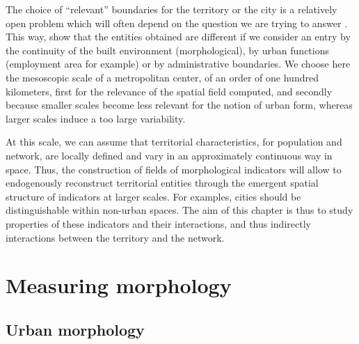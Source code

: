 The choice of ``relevant'' boundaries for the territory or the city is a relatively open problem which will often depend on the question we are trying to answer \citep{paez2005spatial}. This way, \cite{guerois2002commune} show that the entities obtained are different if we consider an entry by the continuity of the built environment (morphological), by urban functions (employment area for example) or by administrative boundaries. We choose here the mesoscopic scale of a metropolitan center, of an order of one hundred kilometers, first for the relevance of the spatial field computed, and secondly because smaller scales become less relevant for the notion of urban form, whereas larger scales induce a too large variability.


At this scale, we can assume that territorial characteristics, for population and network, are locally defined and vary in an approximately continuous way in space. Thus, the construction of fields of morphological indicators will allow to endogenously reconstruct territorial entities through the emergent spatial structure of indicators at larger scales. For examples, cities should be distinguishable within non-urban spaces. The aim of this chapter is thus to study properties of these indicators and their interactions, and thus indirectly interactions between the territory and the network.  




\section{Measuring morphology}

\subsection{Urban morphology}




